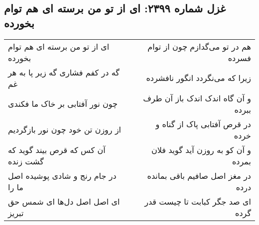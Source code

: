 \begin{center}
\section*{غزل شماره ۲۳۹۹: ای از تو من برسته ای هم توام بخورده}
\label{sec:2399}
\begin{longtable}{l p{0.5cm} r}
ای از تو من برسته ای هم توام بخورده
&&
هم در تو می‌گدازم چون از توام فسرده
\\
گه در کفم فشاری گه زیر پا به هر غم
&&
زیرا که می‌نگردد انگور نافشرده
\\
چون نور آفتابی بر خاک ما فکندی
&&
و آن گاه اندک اندک باز آن طرف ببرده
\\
از روزن تن خود چون نور بازگردیم
&&
در قرص آفتابی پاک از گناه و خرده
\\
آن کس که قرص بیند گوید که گشت زنده
&&
و آن کو به روزن آید گوید فلان بمرده
\\
در جام رنج و شادی پوشیده اصل ما را
&&
در مغز اصل صافیم باقی بمانده درده
\\
ای اصل اصل دل‌ها ای شمس حق تبریز
&&
ای صد جگر کبابت تا چیست قدر گرده
\\
\end{longtable}
\end{center}

